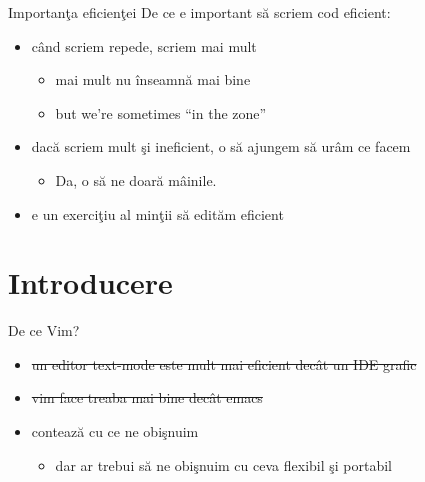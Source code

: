 \documentclass{beamer}
\begin{document}
\begin{frame}{Importanţa eficienţei}
De ce e important să scriem cod eficient:
\begin{itemize}
  \item<2-> când scriem repede, scriem mai mult
    \begin{itemize}
    \item<3-> mai mult nu înseamnă mai bine
    \item<4-> but we're sometimes ``in the zone''
    \end{itemize}
  \item<5-> dacă scriem mult şi ineficient, o să ajungem să urâm ce facem
    \begin{itemize}
    \item<6-> Da, o să ne doară mâinile. 
    \end{itemize}
  \item<8-> e un exerciţiu al minţii să edităm eficient
\end{itemize}
\end{frame}

\section{Introducere}
\frame{\tableofcontents[currentsection]}

\begin{frame}{De ce Vim?}
\begin{itemize}
  \item<1-> \sout{un editor text-mode este mult mai eficient decât un IDE
  grafic}
  \item<2-> \sout{vim face treaba mai bine decât emacs}
  \item<3-> contează cu ce ne obişnuim
    \begin{itemize}
    \item<4-> dar ar trebui să ne obişnuim cu ceva flexibil şi portabil
    \end{itemize}
\end{itemize}
\end{frame}
\end{document}
